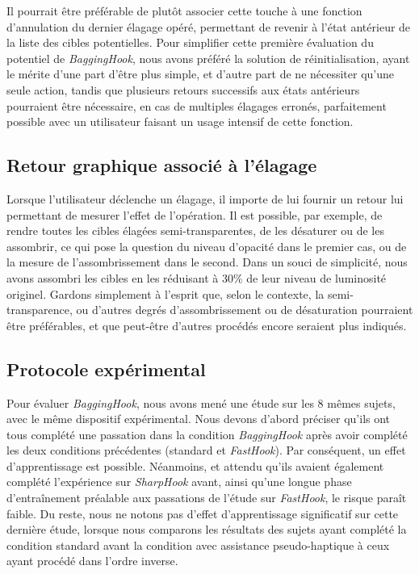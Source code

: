 	Il pourrait être préférable de plutôt associer cette touche à une fonction d'annulation du dernier élagage opéré, permettant de revenir à l'état antérieur de la liste des cibles potentielles. Pour simplifier cette première évaluation du potentiel de \emph{BaggingHook}, nous avons préféré la solution de réinitialisation, ayant le mérite d'une part d'être plus simple, et d'autre part de ne nécessiter qu'une seule action, tandis que plusieurs retours successifs aux états antérieurs pourraient être nécessaire, en cas de multiples élagages erronés, parfaitement possible avec un utilisateur faisant un usage intensif de cette fonction.
	
	
	\subsection{Retour graphique associé à l'élagage}
	Lorsque l'utilisateur déclenche un élagage, il importe de lui fournir un retour lui permettant de mesurer l'effet de l'opération. Il est possible, par exemple, de rendre toutes les cibles élagées semi-transparentes, de les désaturer ou de les assombrir, ce qui pose la question du niveau d'opacité dans le premier cas, ou de la mesure de l'assombrissement dans le second. Dans un souci de simplicité, nous avons assombri les cibles en les réduisant à 30\%{} de leur niveau de luminosité originel. Gardons simplement à l'esprit que, selon le contexte, la semi-transparence, ou d'autres degrés d'assombrissement ou de désaturation pourraient être préférables, et que peut-être d'autres procédés encore seraient plus indiqués.
	
	\subsection{Protocole expérimental}
	Pour évaluer \emph{BaggingHook}, nous avons mené une étude sur les 8 mêmes sujets, avec le même dispositif expérimental. Nous devons d'abord préciser qu'ils ont tous complété une passation dans la condition \emph{BaggingHook} après avoir complété les deux conditions précédentes (standard et \emph{FastHook}). Par conséquent, un effet d'apprentissage est possible. Néanmoins, et attendu qu'ils avaient également complété l'expérience sur \emph{SharpHook} avant, ainsi qu'une longue phase d'entraînement préalable aux passations de l'étude sur \emph{FastHook}, le risque paraît faible. Du reste, nous ne notons pas d'effet d'apprentissage significatif sur cette dernière étude, lorsque nous comparons les résultats des sujets ayant complété la condition standard avant la condition avec assistance pseudo-haptique à ceux ayant procédé dans l'ordre inverse.
	
